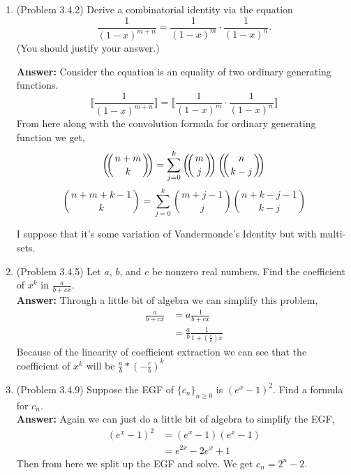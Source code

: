 \documentclass{amsart}
\def\multiset#1#2{\ensuremath{\left(\kern-.3em\left(\genfrac{}{}{0pt}{}{#1}{#2}\right)\kern-.3em\right)}}
\newcommand{\textmultiset}[2]{\bigl(\!{\binom{#1}{#2}}\!\bigr)}
\newcommand{\displaymultiset}[2]{\left(\!{\binom{#1}{#2}}\!\right)}
\newcommand\multiset[2]{\mathchoice{\displaymultiset{#1}{#2}}
                                {\textmultiset{#1}{#2}}
                                {\textmultiset{#1}{#2}}
                                {\textmultiset{#1}{#2}}}
\begin{document}
\thispagestyle{fancy}

 
\begin{enumerate}
\item (Problem 3.4.2) Derive a combinatorial identity via the equation
$$\frac{1}{(1-x)^{m+n}}=\frac{1}{(1-x)^m}\cdot\frac{1}{(1-x)^n}.$$ (You should justify your answer.)

\textbf{Answer:}
Consider the equation is an equality of two ordinary generating functions.
\begin{equation*}
\big\llbracket\frac{1}{(1-x)^{m+n}}\big\rrbracket=\big\llbracket\frac{1}{(1-x)^m}\cdot\frac{1}{(1-x)^n}\big\rrbracket
\end{equation*}
From here along with the convolution formula for ordinary generating function we get,
\begin{equation*}
\multiset{n+m}{k} = \sum_{j=0}^{k} \multiset{m}{j} \multiset{n}{k-j}
\end{equation*}
\begin{equation*}
{n+m+k-1 \choose k} = \sum_{j=0}^{k} {m+j-1 \choose j} {n+k-j-1 \choose k-j}
\end{equation*}

I suppose that it's some variation of Vandermonde's Identity but with multi-sets.


\vspace{1in}

\item (Problem 3.4.5) Let $a$, $b$, and $c$ be nonzero real numbers. Find the coefficient of $x^k$ in $\displaystyle{\frac{a}{b+cx}}.$\\
\textbf{Answer:} Through a little bit of algebra we can simplify this problem,
\begin{align*}
\frac{a}{b+cx} &= a \frac{1}{b+cx}\\
& = \frac{a}{b} \frac{1}{1+(\frac{c}{b})x}
\end{align*}
Because of the linearity of coefficient extraction we can see that the coefficient of $x^k$ will be $\frac{a}{b}*(-\frac{c}{b})^k$
\vspace{1in}

\item (Problem 3.4.9) Suppose the EGF of $\{c_n\}_{n\geq 0}$ is $(e^x-1)^2.$ Find a formula for $c_n.$\\

\textbf{Answer:} Again we can just do a little bit of algebra to simplify the EGF,
\begin{align*}
(e^x-1)^2 &= (e^x - 1)(e^x - 1)\\
&= e^{2x}-2e^x+1
\end{align*}
Then from here we split up the EGF and solve. We get $c_n = 2^n - 2$. 
\vspace{1in}


\end{enumerate}
\end{document}
